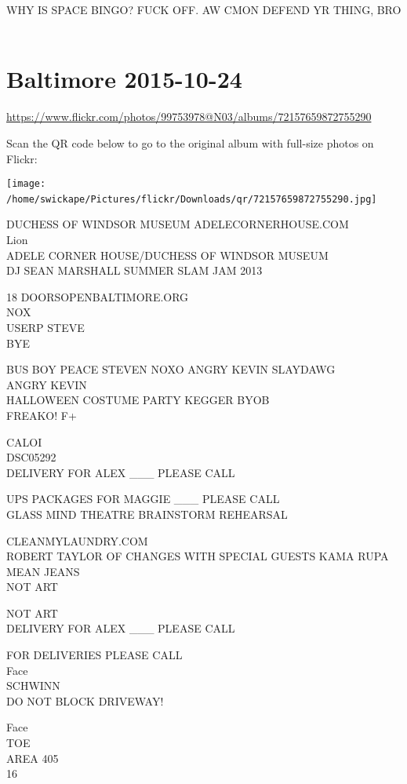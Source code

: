 \documentclass[10pt,letterpaper]{article}
\begin{document}
WHY IS SPACE BINGO?  FUCK OFF.  AW CMON DEFEND YR THING, BRO
\

\section*{Baltimore 2015-10-24}

\url{https://www.flickr.com/photos/99753978@N03/albums/72157659872755290}

Scan the QR code below to go to the original album with full-size photos on Flickr:

\texttt{[image: /home/swickape/Pictures/flickr/Downloads/qr/72157659872755290.jpg]}
\

DUCHESS OF WINDSOR MUSEUM ADELECORNERHOUSE.COM\\
Lion\\
ADELE CORNER HOUSE/DUCHESS OF WINDSOR MUSEUM\\
DJ SEAN MARSHALL SUMMER SLAM JAM 2013

18 DOORSOPENBALTIMORE.ORG\\
NOX\\
USERP STEVE\\
BYE

BUS BOY PEACE STEVEN NOXO ANGRY KEVIN SLAYDAWG\\
ANGRY KEVIN\\
HALLOWEEN COSTUME PARTY KEGGER BYOB\\
FREAKO!  F+

CALOI\\
DSC05292\\
DELIVERY FOR ALEX \_\_\_ PLEASE CALL

UPS PACKAGES FOR MAGGIE \_\_\_ PLEASE CALL\\
GLASS MIND THEATRE BRAINSTORM REHEARSAL

CLEANMYLAUNDRY.COM\\
ROBERT TAYLOR OF CHANGES WITH SPECIAL GUESTS KAMA RUPA\\
MEAN JEANS\\
NOT ART

NOT ART\\
DELIVERY FOR ALEX \_\_\_ PLEASE CALL

FOR DELIVERIES PLEASE CALL\\
Face\\
SCHWINN\\
DO NOT BLOCK DRIVEWAY!

Face\\
TOE\\
AREA 405\\
16
\end{document}
